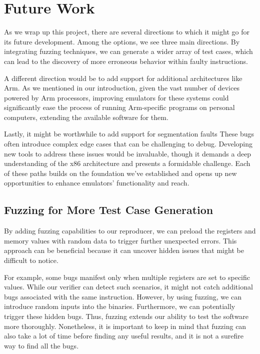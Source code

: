 
\chapter{Future Work}\label{chapter:future_work}
As we wrap up this project, there are several directions to which it might go for its future development.
Among the options, we see three main directions.
By integrating fuzzing techniques, we can generate a wider array of test cases, which can lead to the discovery of more erroneous behavior within faulty instructions.

A different direction would be to add support for additional architectures like Arm.
As we mentioned in our introduction, given the vast number of devices powered by Arm processors, improving emulators for these systems could significantly ease the process of running Arm-specific programs on personal computers, extending the available software for them.

Lastly, it might be worthwhile to add support for segmentation faults
These bugs often introduce complex edge cases that can be challenging to debug.
Developing new tools to address these issues would be invaluable, though it demands a deep understanding of the x86 architecture and presents a formidable challenge.
Each of these paths builds on the foundation we've established and opens up new opportunities to enhance emulators' functionality and reach.

\section{Fuzzing for More Test Case Generation}
By adding fuzzing capabilities to our reproducer, we can preload the registers and memory values with random data to trigger further unexpected errors.
This approach can be beneficial because it can uncover hidden issues that might be difficult to notice.

For example, some bugs manifest only when multiple registers are set to specific values.
While our verifier can detect such scenarios, it might not catch additional bugs associated with the same instruction.
However, by using fuzzing, we can introduce random inputs into the binaries.
Furthermore, we can potentially trigger these hidden bugs.
Thus, fuzzing extends our ability to test the software more thoroughly.
Nonetheless, it is important to keep in mind that fuzzing can also take a lot of time before finding any useful results, and it is not a surefire way to find all the bugs.

